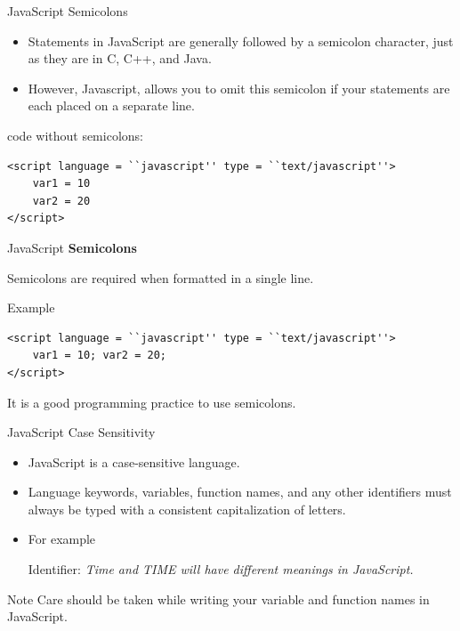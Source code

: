 \documentclass[14pt]{beamer}
\begin{document}
\begin{frame}[fragile]{JavaScript}
Semicolons
\begin{itemize}
 \item Statements in JavaScript are generally followed by a semicolon character, just as they are in C, C++, and Java.
 \item However, Javascript, allows you to omit this semicolon if your statements are each placed on a separate line.
\end{itemize}
\begin{block}{code without semicolons:}
\begin{lstlisting}
<script language = ``javascript'' type = ``text/javascript''>
    var1 = 10
    var2 = 20
</script>
\end{lstlisting}
\end{block}
\end{frame}

\begin{frame}[fragile]{JavaScript}
\textbf{Semicolons}

\vspace{1pc}
Semicolons are required when formatted in a single line.
\begin{block}{Example}
\begin{lstlisting}
<script language = ``javascript'' type = ``text/javascript''>
    var1 = 10; var2 = 20;
</script>
\end{lstlisting}
\end{block}
It is a good programming practice to use semicolons.
\end{frame}

\begin{frame}{JavaScript}
Case Sensitivity
\small
\begin{itemize}
 \item JavaScript is a case-sensitive language.
 \item Language keywords, variables, function names, and any other identifiers must always be typed with a consistent capitalization of letters.
 \item For example 
 
 Identifier: \em{Time} and \emph{TIME} will have different meanings in JavaScript.
\end{itemize}
\begin{block}{Note}
Care should be taken while writing your variable and function names in JavaScript.
\end{block}
\end{frame}
\end{document}
